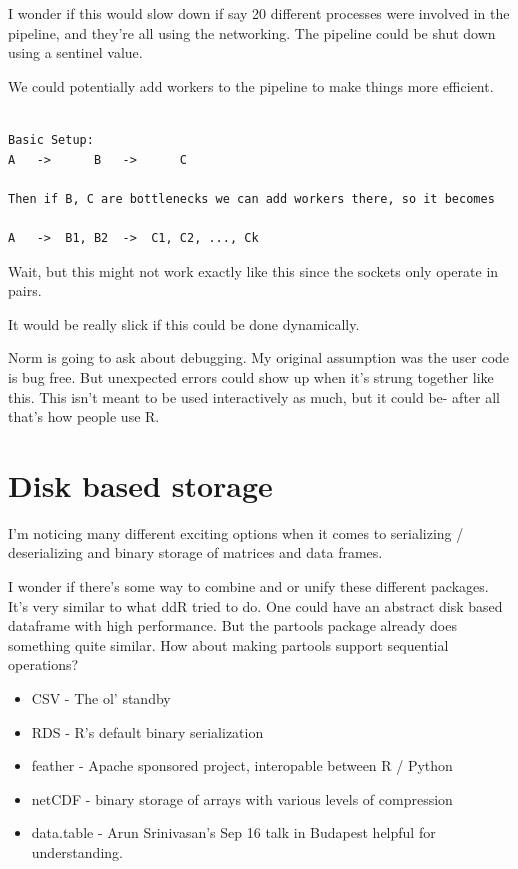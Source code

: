 \documentclass[12pt]{article}
\begin{document}
I wonder if this would slow down if say 20 different processes were
involved in the pipeline, and they're all using the networking.
The pipeline could be shut down using a sentinel value.

We could potentially add workers to the pipeline to make things more
efficient.
\begin{verbatim}

Basic Setup:
A   ->      B   ->      C

Then if B, C are bottlenecks we can add workers there, so it becomes

A   ->  B1, B2  ->  C1, C2, ..., Ck

\end{verbatim}

Wait, but this might not work exactly like this since the sockets only
operate in pairs.

It would be really slick if this could be done dynamically. 

Norm is going to ask about debugging. My original assumption was the user
code is bug free. But unexpected errors could show up when it's strung
together like this. This isn't meant to be used interactively as much, but
it could be- after all that's how people use R.

\section{Disk based storage}

I'm noticing many different exciting options when it comes to serializing /
deserializing and binary storage of matrices and data frames.

I wonder if there's some way to combine and or unify these different
packages. It's very similar to what ddR tried to do. One could have an
abstract disk based dataframe with high performance. But the partools package already does
something quite similar. How about making partools support sequential
operations?


\begin{itemize}
    \item CSV - The ol' standby
    \item RDS - R's default binary serialization
    \item feather - Apache sponsored project, interopable between R /
        Python
    \item netCDF - binary storage of arrays with various levels of
        compression
    \item data.table - Arun Srinivasan's Sep 16 talk in Budapest helpful
        for understanding.

\end{itemize}
\end{document}
